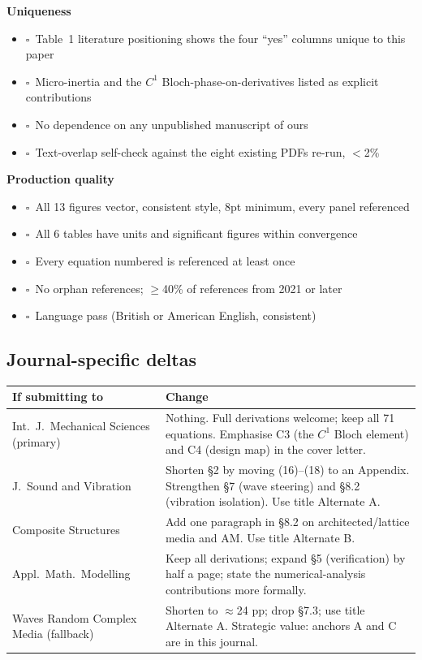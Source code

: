 \documentclass[11pt,a4paper]{article}
\newcommand{\chk}{$\square$~}
\begin{document}
\textbf{Uniqueness}
\begin{itemize}
\item \chk Table~1 literature positioning shows the four ``yes'' columns unique to this paper
\item \chk Micro-inertia and the $C^1$ Bloch-phase-on-derivatives listed as explicit contributions
\item \chk No dependence on any unpublished manuscript of ours
\item \chk Text-overlap self-check against the eight existing PDFs re-run, $<$2\%
\end{itemize}

\textbf{Production quality}
\begin{itemize}
\item \chk All 13 figures vector, consistent style, 8pt minimum, every panel referenced
\item \chk All 6 tables have units and significant figures within convergence
\item \chk Every equation numbered is referenced at least once
\item \chk No orphan references; $\ge$40\% of references from 2021 or later
\item \chk Language pass (British or American English, consistent)
\end{itemize}

\subsection{Journal-specific deltas}
\label{sec:submission}

\begin{tabularx}{\textwidth}{@{}L{4.6cm} Y@{}}
\toprule
If submitting to & Change \\
\midrule
Int.\ J.\ Mechanical Sciences (primary) & Nothing. Full derivations welcome; keep all 71 equations. Emphasise C3 (the $C^1$ Bloch element) and C4 (design map) in the cover letter. \\
J.\ Sound and Vibration & Shorten \S2 by moving (16)--(18) to an Appendix. Strengthen \S7 (wave steering) and \S8.2 (vibration isolation). Use title Alternate A. \\
Composite Structures & Add one paragraph in \S8.2 on architected/lattice media and AM. Use title Alternate B. \\
Appl.\ Math.\ Modelling & Keep all derivations; expand \S5 (verification) by half a page; state the numerical-analysis contributions more formally. \\
Waves Random Complex Media (fallback) & Shorten to $\approx$24 pp; drop \S7.3; use title Alternate A. Strategic value: anchors A and C are in this journal. \\
\bottomrule
\end{tabularx}
\end{document}
